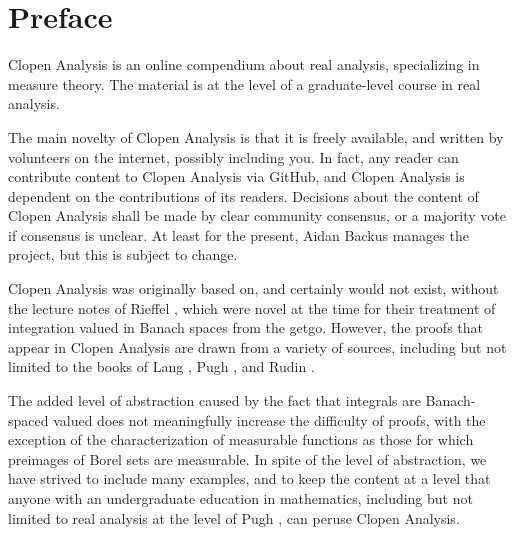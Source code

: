 \chapter*{Preface}
Clopen Analysis is an online compendium about real analysis, specializing in measure theory.
The material is at the level of a graduate-level course in real analysis.

The main novelty of Clopen Analysis is that it is freely available, and written by volunteers on the internet, possibly including you.
In fact, any reader can contribute content to Clopen Analysis via GitHub, and Clopen Analysis is dependent on the contributions of its readers.
Decisions about the content of Clopen Analysis shall be made by clear community consensus, or a majority vote if consensus is unclear.
At least for the present, Aidan Backus manages the project, but this is subject to change.

Clopen Analysis was originally based on, and certainly would not exist, without the lecture notes of Rieffel \cite{Rieffel1970}, which were novel at the time for their treatment of integration valued in Banach spaces from the getgo.
However, the proofs that appear in Clopen Analysis are drawn from a variety of sources, including but not limited to the books of Lang \cite{lang2012real}, Pugh \cite{pugh2013real}, and Rudin \cite{rudin1978real}.

The added level of abstraction caused by the fact that integrals are Banach-spaced valued does not meaningfully increase the difficulty of proofs, with the exception of the characterization of measurable functions as those for which preimages of Borel sets are measurable.
In spite of the level of abstraction, we have strived to include many examples, and to keep the content at a level that anyone with an undergraduate education in mathematics, including but not limited to real analysis at the level of Pugh \cite{pugh2013real}, can peruse Clopen Analysis.

\newpage
